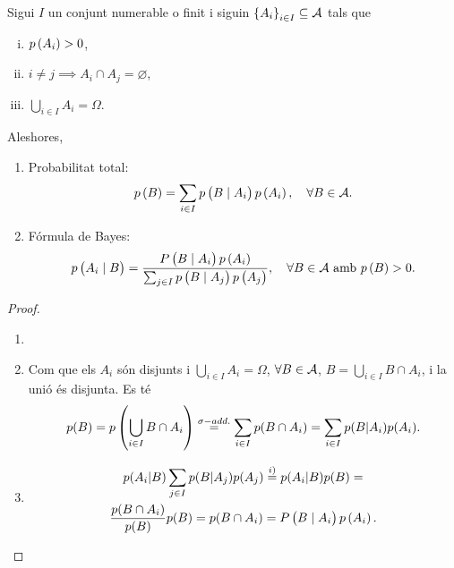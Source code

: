 \begin{prop}
    Sigui $I$ un conjunt numerable o finit i siguin $\left\{ A_i \right\}_{i\in I} \subseteq \mathcal{A}$ tals que 
    \begin{enumerate}[i)]
        \item $p\left( A_i\right)>0$,
        \item $i\neq j \implies A_i \cap A_j = \varnothing$,
        \item $\bigcup\limits_{i\in I} A_i = \Omega$.
    \end{enumerate}
    Aleshores,
    \begin{enumerate}[1)]
        \item Probabilitat total:
            \[
                p\left( B\right)=\sum_{i\in I} p\left( B\mid A_i\right) p\left( A_i\right), \quad \forall B\in \mathcal{A}.
            \]
        \item Fórmula de Bayes:
            \[
                p\left( A_i\mid B\right)=\frac{P\left( B\mid A_i\right) p\left( A_i\right)}{\sum_{j\in I} p\left( B\mid A_j\right) p\left( A_j\right)}, \quad \forall B\in \mathcal{A} \text{ amb } p\left( B\right)>0.
            \]
    \end{enumerate}
\end{prop}
\begin{proof}
    \begin{enumerate}[1)]
        \item[]
        \item Com que els $A_i$ són disjunts i $\bigcup_{i \in I}{A_i} = \Omega$, $\forall B \in \mathcal{A}$,
        $B = \bigcup_{i\in I}{B \cap A_i}$, i la unió és disjunta. Es té
        \[
            p(B) = p\left(\bigcup_{i\in I}{B \cap A_i}\right) \stackrel{\sigma-add.}{=} \sum_{i\in I}{p(B \cap A_i)} =
            \sum_{i\in I}{p(B|A_i)p(A_i)}.
        \]
        \item
        \begin{gather*}
            p(A_i|B) \sum_{j \in I}{p(B|A_j)p(A_j)} \stackrel{i)}{=} p(A_i|B)p(B) =\\
            \frac{p(B\cap A_i)}{p(B)}p(B) = p(B \cap A_i) = P\left( B\mid A_i\right) p\left( A_i\right).
        \end{gather*}
    \end{enumerate}
\end{proof}

